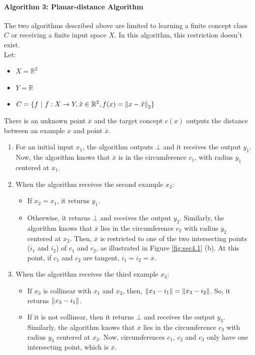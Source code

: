 \paragraph{Algorithm 3: Planar-distance Algorithm}
The two algorithms described above are limited to learning a finite concept
class $C$ or receiving a finite input space $X$. In this algorithm, this
restriction doesn't exist. \\

Let:
\begin{itemize}
  \item $ X = \mathbb{R}^2 $
  \item $ Y = \mathbb{R} $
  \item $ C = \{ f \ | \ f : X \to Y, \hat{x} \in \mathbb{R}^2, f(x) = \left\lVert x - \hat{x}\right\rVert_2 \} $
\end{itemize}

There is an unknown point $\overline{x}$ and the target concept $c(x)$ outputs
the distance between an example $x$ and point $\overline{x}$. \\
\begin{enumerate}
  \item For an initial input $x_1$, the algorithm outputs $\bot$ and it receives
  the output $y_1$. Now, the algorithm knows that $\overline{x}$ is in the
  circumference $c_1$, with radius $y_1$ centered at $x_1$.
  \item When the algorithm receives the second example $x_2$:
  \begin{itemize}
    \item If $x_2 = x_1$, it returns $y_1$.
    \item Otherwise, it returns $\bot$ and receives the output $y_2$. Similarly,
    the algorithm knows that $\overline{x}$ lies in the circumference $c_2$ with
    radius $y_2$ centered at $x_2$. Then, $\overline{x}$ is restricted to one of
    the two intersecting points ($i_1$ and $i_2$) of $c_1$ and $c_2$, as illustrated in Figure
    \ref{fig:sec4.1} (b). At this point, if $c_1$ and $c_2$ are tangent, $i_1 =
    i_2 = \overline{x}$.
  \end{itemize}
  \item When the algorithm receives the third example $x_3$:
  \begin{itemize}
    \item If $x_3$ is collinear with $x_1$ and $x_2$, then, $\left\lVert x_3 - i_1\right\rVert =
    \left\lVert x_3 - i_2\right\rVert$. So, it returns $\left\lVert x_3 - i_1\right\rVert$.
    \item If it is not collinear, then it returns $\bot$ and receives the output
    $y_3$. Similarly, the algorithm knows that $\overline{x}$ lies in the
    circumference $c_3$ with radius $y_3$ centered at $x_3$. Now, circumferences
    $c_1$, $c_2$ and $c_3$ only have one intersecting point, which is
    $\overline{x}$.
  \end{itemize}
\end{enumerate}

